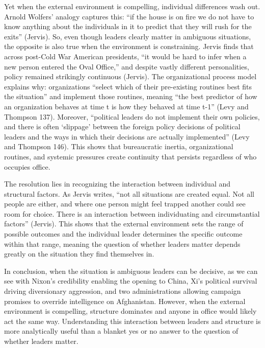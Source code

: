 \documentclass[12pt]{article}
\begin{document}
Yet when the external environment is compelling, individual differences wash out. Arnold Wolfers' analogy captures this: ``if the house is on fire we do not have to know anything about the individuals in it to predict that they will rush for the exits'' (Jervis). So, even though leaders clearly matter in ambiguous situations, the opposite is also true when the environment is constraining. Jervis finds that across post-Cold War American presidents, ``it would be hard to infer when a new person entered the Oval Office,'' and despite vastly different personalities, policy remained strikingly continuous (Jervis). The organizational process model explains why: organizations ``select which of their pre-existing routines best fits the situation'' and implement those routines, meaning ``the best predictor of how an organization behaves at time t is how they behaved at time t-1'' (Levy and Thompson 137). Moreover, ``political leaders do not implement their own policies, and there is often `slippage' between the foreign policy decisions of political leaders and the ways in which their decisions are actually implemented'' (Levy and Thompson 146). This shows that bureaucratic inertia, organizational routines, and systemic pressures create continuity that persists regardless of who occupies office.

The resolution lies in recognizing the interaction between individual and structural factors. As Jervis writes, ``not all situations are created equal. Not all people are either, and where one person might feel trapped another could see room for choice. There is an interaction between individuating and circumstantial factors'' (Jervis). This shows that the external environment sets the range of possible outcomes and the individual leader determines the specific outcome within that range, meaning the question of whether leaders matter depends greatly on the situation they find themselves in.

In conclusion, when the situation is ambiguous leaders can be decisive, as we can see with Nixon's credibility enabling the opening to China, Xi's political survival driving diversionary aggression, and two administrations allowing campaign promises to override intelligence on Afghanistan. However, when the external environment is compelling, structure dominates and anyone in office would likely act the same way. Understanding this interaction between leaders and structure is more analytically useful than a blanket yes or no answer to the question of whether leaders matter.
\end{document}
